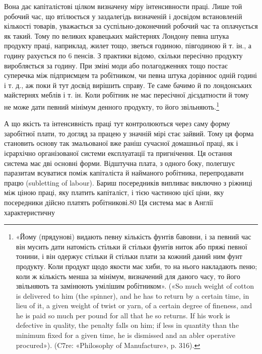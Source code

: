 Вона дає капіталістові цілком визначену міру інтенсивности
праці. Лише той робочий час, що втілюється у заздалегідь визначеній
і досвідом встановленій кількості товарів, уважається за
суспільно-доконечний робочий час та оплачується як такий.
Тому по великих кравецьких майстернях Лондону певна штука
продукту праці, наприклад, жилет тощо, зветься годиною,
півгодиною й т. ін., а годину рахується по 6 пенсів. З практики
відомо, скільки пересічно продукту виробляється за годину.
При зміні моди або полагодженнях тощо постає суперечка між
підприємцем та робітником, чи певна штука дорівнює одній годині
і т. д., аж поки й тут досвід вирішить справу. Те саме бачимо й
по лондонських майстернях меблів і т. ін. Коли робітник не має
пересічної дієздатности й тому не може дати певний мінімум денного
продукту, то його звільняють.\footnote{
«Йому (прядунові) видають певну кількість фунтів бавовни, і за
певний час він мусить дати натомість стільки й стільки фунтів ниток
або пряжі певної тонини, і він одержує стільки й стільки плати за кожний
даний ним фунт продукту. Коли продукт щодо якости має хиби, то
на нього накладають пеню; коли ж кількість менша за мінімум, визначений
для даного часу, то його звільняють та замінюють умілішим робітником».
(«So much weight of cotton is delivered to him (the spinner),
and he has to return by a certain time, in lieu of it, a given weight of
twist or yarn, of a certain degree of fineness, and he is paid so much per
pound for all that he so returns. If his work is defective in quality, the
penalty falls on him; if less in quantity than the minimum fixed for a
given time, he is dismissed and an abler operative procured»). (C7re: «Philosophy
of Manufacture», p. 316).
}

А що якість та інтенсивність праці тут контролюються через
саму форму заробітної плати, то догляд за працею у значній мірі
стає зайвий. Тому ця форма становить основу так змальованої
вже раніш сучасної домашньої праці, як і ієрархічно організованої
системи експлуатації та пригнічення. Ця остання система
має дві основні форми. Відштучна плата, з одного боку, полегшує
паразитам всуватися поміж капіталіста й найманого робітника,
перепродавати працю (subletting of labour). Бариш посередників
випливає виключно з ріжниці між ціною праці, яку платить
капіталіст, і тією частиною цієї ціни, яку посередники дійсно
платять робітникові.80 Ця система має в Англії характеристичну

